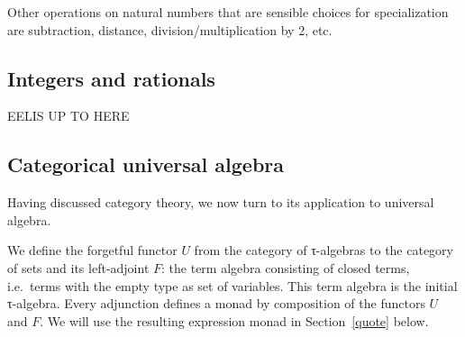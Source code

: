 \documentclass[a4paper,10pt,runningheads]{llncs}
\begin{document}
Other operations on natural numbers that are sensible choices for specialization are subtraction, distance, division/multiplication by 2, etc.

\subsection{Integers and rationals}









EELIS UP TO HERE



\subsection{Categorical universal algebra}
Having discussed category theory, we now turn to its application to universal algebra.

We define the forgetful functor $U$ from the category of τ-algebras to the category of sets and its left-adjoint $F$: the term algebra consisting of closed terms, i.e.\ terms with the empty type as set of variables. This term algebra is the initial τ-algebra. Every adjunction defines a monad by composition of the functors $U$ and $F$. We will use the resulting expression monad in Section~\ref{quote} below.
\end{document}

